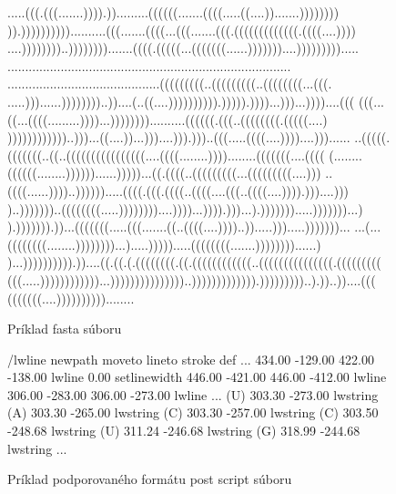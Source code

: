 \begin{figure}[H]
\begin{code}[fontsize=\scriptsize, frame=none, samepage=true]
.....(((.(((.......)))).)).........((((((.......((((.....((....)).......))))))))
)).))))))))))..........(((.......((((...(((.......(((.(((((((((((((.((((....))))
....))))))))..)))))))).......((((.(((((...(((((((......)))))))....))))))))).....
................................................................................
...........................................(((((((((..(((((((((..((((((((...(((.
.....)))......))))))))..))....(..((....)))))))))).))))).))))...)))...))))....(((
(((...((...((((.........))))...))))))))..........((((((.(((..((((((((.(((((....)
))))))))))))..)))...((....))...)))....))).)))..(((.....((((....))))....)))......
..(((((.(((((((..((..((((((((((((((((....((((........))))........(((((((....((((
(........((((((........))))))......)))))...((.((((..(((((((((...(((((((((....)))
..((((......))))..)))))).....((((.(((.((((..((((....(((..((((....)))).)))....)))
)..)))))))..((((((((.....))))))))....))))...)))).)))...).))))))).....)))))))...)
).))))))).))...(((((((.....(((.......((..((((....))))..)).....))).....)))))))...
...(...((((((((........))))))))...).....))))).....((((((((.......))))))))......)
)...)))))))))).))....((.((.(.((((((((.((.((((((((((((..(((((((((((((((.(((((((((
(((.....))))))))))))...)))))))))))))))..))))))))))))).)))))))))..).))..))....(((
(((((((....))))))))))........
\end{code}
\caption{Príklad fasta súboru}
\label{obr:mouse_fasta}
\end{figure}

\begin{figure}[H]
\begin{code}[fontsize=\scriptsize, frame=none, samepage=true]
/lwline {newpath moveto lineto stroke} def
  ...
434.00 -129.00 422.00 -138.00 lwline
0.00 setlinewidth
446.00 -421.00 446.00 -412.00 lwline
306.00 -283.00 306.00 -273.00 lwline
  ...
(U) 303.30 -273.00 lwstring
(A) 303.30 -265.00 lwstring
(C) 303.30 -257.00 lwstring
(C) 303.50 -248.68 lwstring
(U) 311.24 -246.68 lwstring
(G) 318.99 -244.68 lwstring
  ...
\end{code}
\caption{Príklad podporovaného formátu post script súboru}
\label{obr:mouse_ps_text}
\end{figure}

